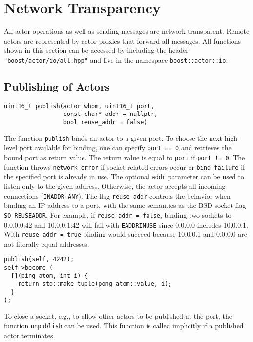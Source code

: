 \section{Network Transparency}

All actor operations as well as sending messages are network transparent.
Remote actors are represented by actor proxies that forward all messages.
All functions shown in this section can be accessed by including the header \lstinline^"boost/actor/io/all.hpp"^ and live in the namespace \lstinline^boost::actor::io^.

\subsection{Publishing of Actors}

\begin{lstlisting}
uint16_t publish(actor whom, uint16_t port,
                 const char* addr = nullptr,
                 bool reuse_addr = false)
\end{lstlisting}

The function \lstinline^publish^ binds an actor to a given port.
To choose the next high-level port available for binding, one can specify \lstinline^port == 0^ and retrieves the bound port as return value.
The return value is equal to \lstinline^port^ if \lstinline^port != 0^.
The function throws \lstinline^network_error^ if socket related errors occur or \lstinline^bind_failure^ if the specified port is already in use.
The optional \lstinline^addr^ parameter can be used to listen only to the given address.
Otherwise, the actor accepts all incoming connections (\lstinline^INADDR_ANY^).
The flag \lstinline^reuse_addr^ controls the behavior when binding an IP
address to a port, with the same semantics as the BSD socket flag \lstinline^SO_REUSEADDR^.
For example, if \lstinline^reuse_addr = false^, binding two sockets to 0.0.0.0:42 and 10.0.0.1:42 will fail with \texttt{EADDRINUSE} since 0.0.0.0 includes 10.0.0.1. 
With \lstinline^reuse_addr = true^ binding would succeed because 10.0.0.1 and
0.0.0.0 are not literally equal addresses.


\begin{lstlisting}
publish(self, 4242);
self->become (
  [](ping_atom, int i) {
    return std::make_tuple(pong_atom::value, i);
  }
);
\end{lstlisting}

To close a socket, e.g., to allow other actors to be published at the port, the function \lstinline^unpublish^ can be used.
This function is called implicitly if a published actor terminates.

